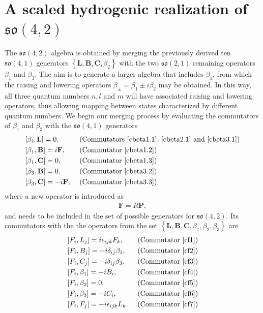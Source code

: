 \documentclass[12pt,a4paper]{report}
\theoremstyle{definition}
\theoremstyle{remark}
\theoremstyle{remark}
\begin{document}
\section{A scaled hydrogenic realization of $\mathfrak{so}(4,2)$}
The $\mathfrak{so}(4,2)$ algebra is obtained by merging the previously derived ten $\mathfrak{so}(4,1)$ generators $\left\lbrace \textbf{L},\textbf{B},\textbf{C},\beta_2 \right\rbrace$ with the two $\mathfrak{so}(2,1)$ remaining operators $\beta_1$ and $\beta_3$. The aim is to generate a larger algebra that includes $\beta_1$, from which the raising and lowering operators $\beta_\pm=\beta_1\pm i\beta_2$ may be obtained. In this way, all three quantum numbers $n,l$ and $m$ will have associated raising and lowering operators, thus allowing mapping between states characterized by different quantum numbers.
We begin our merging process by evaluating the commutators of $\beta_1$ and $\beta_3$ with the $\mathfrak{so}(4,1)$ generators
\begin{equation*}
\begin{aligned}
&[\beta_i,\textbf{L}]=0, &&\text{ (Commutators~\ref{cbeta1.1},~\ref{cbeta2.1} and~\ref{cbeta3.1})}\\
&[\beta_1,\textbf{B}]=i\textbf{F}, &&\text{ (Commutator~\ref{cbeta1.2})}\\
&[\beta_1,\textbf{C}]=0, &&\text{ (Commutator~\ref{cbeta1.3})}\\
&[\beta_3,\textbf{B}]=0, &&\text{ (Commutator~\ref{cbeta3.2})}\\
&[\beta_3,\textbf{C}]=-i\textbf{F}, &&\text{ (Commutator~\ref{cbeta3.3})}
\end{aligned}
\end{equation*}
where a new operator is introduced as
\begin{align*}
\textbf{F}=R\textbf{P},
\end{align*}
and needs to be included in the set of possible generators for $\mathfrak{so}(4,2)$. Its commutators with the the operators from the set $\left\lbrace \textbf{L},\textbf{B},\textbf{C},\beta_1,\beta_2,\beta_3 \right\rbrace$ are
\begin{equation*}
\begin{aligned}
&[F_i,L_j]=i\epsilon_{ijk}F_k, &&\text{ (Commutator~\ref{cf1})}\\
&[F_i,B_j]=-i\delta_{ij}\beta_1, &&\text{ (Commutator~\ref{cf2})}\\
&[F_i,C_j]=-i\delta_{ij}\beta_3, &&\text{ (Commutator~\ref{cf3})}\\
&[F_i,\beta_1]=-iB_i, &&\text{ (Commutator~\ref{cf4})}\\
&[F_i,\beta_2]=0, &&\text{ (Commutator~\ref{cf5})}\\
&[F_i,\beta_3]=-iC_i, &&\text{ (Commutator~\ref{cf6})}\\
&[F_i,F_j]=-i\epsilon_{ijk}L_k. &&\text{ (Commutator~\ref{cf7})}
\end{aligned}
\end{equation*}
\end{document}
